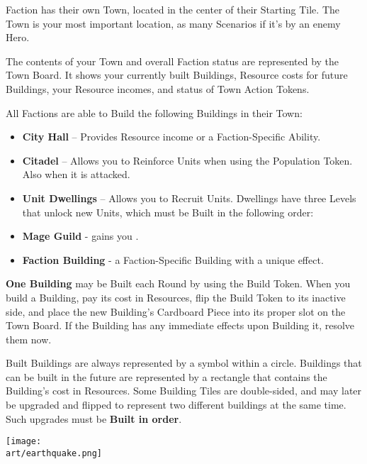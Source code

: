 
\begin{multicols*}{2}

 Faction has their own Town, located in the center of their Starting Tile.
The Town is your most important location, as many Scenarios  if it's  by an enemy Hero.\par
The contents of your Town and overall Faction status are represented by the Town Board.
It shows your currently built Buildings, Resource costs for future Buildings, your Resource incomes, and status of Town Action Tokens.\par
All Factions are able to Build the following Buildings in their Town:
\begin{itemize}
  \item \textbf{City Hall} – Provides Resource income or a Faction-Specific Ability.
  \item \textbf{Citadel} – Allows you to Reinforce Units when using the Population Token.
Also  when it is attacked.
  \item \textbf{Unit Dwellings} – Allows you to Recruit Units.
Dwellings have three Levels that unlock new Units, which must be Built in the following order: 
  \item \textbf{Mage Guild} - gains you .
  \item \textbf{Faction Building} - a Faction-Specific Building with a unique effect.
\end{itemize}
\textbf{One Building} may be Built each Round by using the Build Token.
When you build a Building, pay its cost in Resources, flip the Build Token to its inactive side, and place the new Building’s Cardboard Piece into its proper slot on the Town Board.
If the Building has any immediate effects upon Building it, resolve them now.\par
Built Buildings are always represented by a symbol within a circle.
Buildings that can be built in the future are represented by a rectangle that contains the Building's cost in Resources.
Some Building Tiles are double-sided, and may later be upgraded and flipped to represent two different buildings at the same time. Such upgrades must be \textbf{Built in order}.\par

\vspace*{\fill}

\begin{center}
  \texttt{[image: \\art/earthquake.png]}
\end{center}

\vspace*{\fill}

\end{multicols*}
